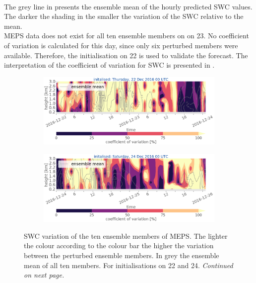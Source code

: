 \\
The grey line in  presents the ensemble mean of the hourly predicted SWC values. The darker the shading in  the smaller the variation of the SWC relative to the mean. 
\\
MEPS data does not exist for all ten ensemble members on on \SI{23}{\dec}. No coefficient of variation is calculated for this day, since only six perturbed members were available. Therefore, the initialisation on \SI{22}{\dec} is used to validate the forecast. The interpretation of the coefficient of variation for SWC is presented in .
\begin{figure}[t!]
	\centering
	\begin{subfigure}[b]{\textwidth}
		\includegraphics[trim={0cm 5cm 0cm 0cm},clip,width=\textwidth]{./fig_variation/20161222}
		\caption{}\label{fig:vari:EM22}
	\end{subfigure}
	\begin{subfigure}[b]{\textwidth}
		\includegraphics[trim={0cm 0cm 0cm 0cm},clip,width=\textwidth]{./fig_variation/20161224}
		\caption{}\label{fig:vari:EM24}
	\end{subfigure}
	\caption{SWC variation of the ten ensemble members of MEPS. The lighter the colour according to the colour bar the higher the variation between the perturbed ensemble members. In grey the ensemble mean of all ten members. For initialisations on \num{22} and \SI{24}{\dec}. \textit{Continued on next page.}}\label{fig:ens_vari}
\end{figure}
